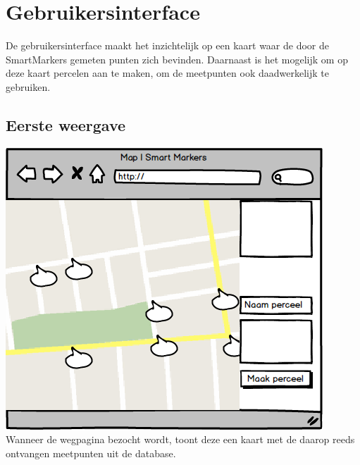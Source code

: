 \section{Gebruikersinterface}

De gebruikersinterface maakt het inzichtelijk op een kaart waar de door de
SmartMarkers gemeten punten zich bevinden. Daarnaast is het mogelijk om op
deze kaart percelen aan te maken, om de meetpunten ook daadwerkelijk te
gebruiken.

\subsection*{Eerste weergave}
\includegraphics{functional/map_1.png}
Wanneer de wegpagina bezocht wordt, toont deze een kaart met de daarop reeds
ontvangen meetpunten uit de database.

